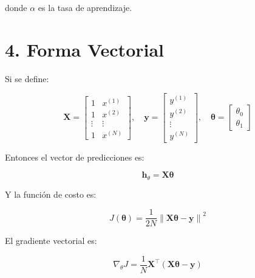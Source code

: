 \documentclass[12pt]{article}
\begin{document}
donde $\alpha$ es la tasa de aprendizaje.

\section*{4. Forma Vectorial}

Si se define:

\[
\textbf{X} = \begin{bmatrix}
1 & x^{(1)} \\
1 & x^{(2)} \\
\vdots & \vdots \\
1 & x^{(N)}
\end{bmatrix}, \quad 
\bm{y} = \begin{bmatrix}
y^{(1)} \\
y^{(2)} \\
\vdots \\
y^{(N)}
\end{bmatrix}, \quad
\bm{\theta} = \begin{bmatrix}
\theta_0 \\
\theta_1
\end{bmatrix}
\]

Entonces el vector de predicciones es:

\[
\bm{h}_\theta = \bm{X} \bm{\theta}
\]

Y la función de costo es:

\[
J(\bm{\theta}) = \frac{1}{2N} \left\| \bm{X} \bm{\theta} - \bm{y} \right\|^2
\]

El gradiente vectorial es:

\[
\nabla_\theta J = \frac{1}{N} \bm{X}^\top (\bm{X} \bm{\theta} - \bm{y})
\]
\end{document}
